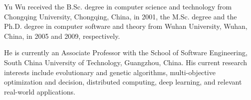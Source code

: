 \documentclass[10pt, journal]{IEEEtran}
\begin{document}
	\begin{IEEEbiography}{Yu Wu}
		received the B.Sc. degree in computer science and technology from
		Chongqing University, Chongqing, China, in 2001, the M.Sc. degree
		and the Ph.D. degree in computer software and theory from Wuhan
		University, Wuhan, China, in 2005 and 2009, respectively.

        He is currently an Associate Professor with the School of Software
		Engineering, South China University of Technology, Guangzhou, China.
		His current research interests include evolutionary and genetic
		algorithms, multi-objective optimization and decision, distributed computing, deep learning, and relevant real-world
		applications.
		
	\end{IEEEbiography}

\end{document}
